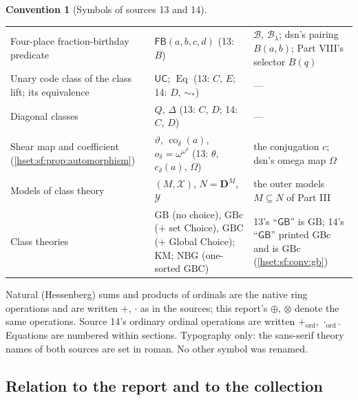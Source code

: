 \documentclass[11pt,letterpaper]{article}
\theoremstyle{definition}
\newtheorem{convention}[convention]{Convention}\aliascntresetthe{convention}
\theoremstyle{remark}
\newcommand{\B}{\mathcal B}
\newcommand{\nsum}{\mathbin{\oplus}}
\newcommand{\nprod}{\mathbin{\otimes}}
\newcommand{\GB}{\mathrm{GB}}
\newcommand{\GBc}{\mathrm{GBc}}
\newcommand{\GBC}{\mathrm{GBC}}
\newcommand{\NBG}{\mathrm{NBG}}
\newcommand{\KM}{\mathrm{KM}}
\newcommand{\Eqc}{\operatorname{Eq}}
\newcommand{\FB}{\mathsf{FB}}
\newcommand{\UC}{\mathsf{UC}}
\newcommand{\Dd}{\mathbf{D}}
\begin{document}
\begin{convention}[Symbols of sources 13 and 14]
\begin{center}
\begin{longtable}{@{}P{0.25\textwidth}P{0.27\textwidth}P{0.40\textwidth}@{}}
Four-place fraction-birthday predicate & $\FB(a,b,c,d)$ (13: $B$) & $\B$, $\B_\lambda$; dsn's pairing $B(a,b)$; Part VIII's selector $B(q)$\\
Unary code class of the class lift; its equivalence & $\UC$; $\Eqc$ (13: $C$, $E$; 14: $D$, $\sim_*$) & ---\\
Diagonal classes & $Q$, $\Delta$ (13: $C$, $D$; 14: $C$, $D$) & ---\\
Shear map and coefficient (\cref{hset:sf:prop:automorphism}) & $\vartheta$, $\operatorname{co}_\delta(a)$, $o_\delta=\omega^{\omega^\delta}$ (13: $\theta$, $c_\delta(a)$, $\Omega$) & the conjugation $c$; dsn's omega map $\Omega$\\
Models of class theory & $(M,\mathcal X)$, $N=\Dd^M$, $\mathcal Y$ & the outer models $M\subseteq N$ of Part III\\
Class theories & $\GB$ (no choice), $\GBc$ ($+$ set Choice), $\GBC$ ($+$ Global Choice); $\KM$; $\NBG$ (one-sorted $\GBC$) & 13's ``$\mathsf{GB}$'' is $\GB$; 14's ``$\mathsf{GB}$'' printed GBc and is $\GBc$ (\cref{hset:sf:conv:gb})\\
\bottomrule
\end{longtable}
\end{center}
Natural (Hessenberg) sums and products of ordinals are the native ring
operations and are written $+$, $\cdot$ as in the sources; this report's
$\nsum$, $\nprod$ denote the same operations. Source 14's ordinary ordinal
operations are written $+_{\mathrm{ord}}$, $\cdot_{\mathrm{ord}}$. Equations are
numbered within sections. Typography only: the sans-serif theory names of both
sources are set in roman. No other symbol was renamed.
\end{convention}

\subsection{Relation to the report and to the collection}
\label{hset:sf:sub:relation}
\end{document}
